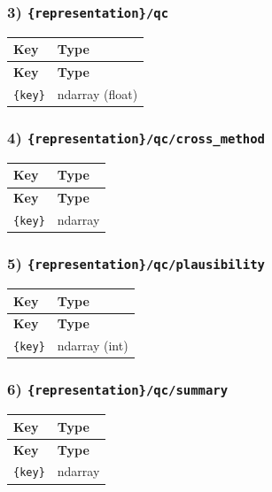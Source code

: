 \documentclass[11pt]{article}
\begin{document}
\subsubsection*{3) \texttt{\{representation\}/\allowbreak{}qc}}
\begin{longtable}{|p{}|p{}|}
\hline
\textbf{Key} & \textbf{Type} \\ \hline
\endfirsthead
\hline
\textbf{Key} & \textbf{Type} \\ \hline
\endhead
\texttt{\{key\}} & ndarray (float) \\ \hline
\end{longtable}

\subsubsection*{4) \texttt{\{representation\}/\allowbreak{}qc/\allowbreak{}cross\_\allowbreak{}method}}
\begin{longtable}{|p{}|p{}|}
\hline
\textbf{Key} & \textbf{Type} \\ \hline
\endfirsthead
\hline
\textbf{Key} & \textbf{Type} \\ \hline
\endhead
\texttt{\{key\}} & ndarray \\ \hline
\end{longtable}

\subsubsection*{5) \texttt{\{representation\}/\allowbreak{}qc/\allowbreak{}plausibility}}
\begin{longtable}{|p{}|p{}|}
\hline
\textbf{Key} & \textbf{Type} \\ \hline
\endfirsthead
\hline
\textbf{Key} & \textbf{Type} \\ \hline
\endhead
\texttt{\{key\}} & ndarray (int) \\ \hline
\end{longtable}

\subsubsection*{6) \texttt{\{representation\}/\allowbreak{}qc/\allowbreak{}summary}}
\begin{longtable}{|p{}|p{}|}
\hline
\textbf{Key} & \textbf{Type} \\ \hline
\endfirsthead
\hline
\textbf{Key} & \textbf{Type} \\ \hline
\endhead
\texttt{\{key\}} & ndarray \\ \hline
\end{longtable}
\end{document}
